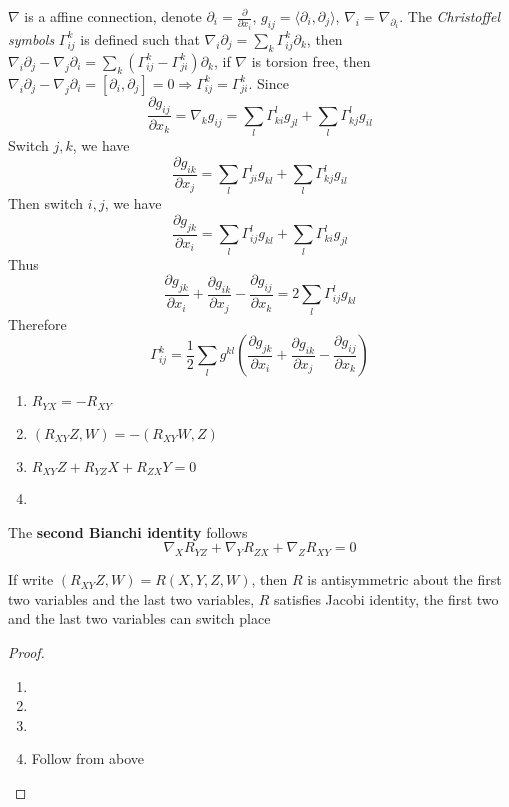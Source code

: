 \documentclass[main]{subfiles}
\begin{document}
\begin{definition}
$\nabla$ is a affine connection, denote $\partial_i=\frac{\partial}{\partial x_i}$, $g_{ij}=\langle\partial_i,\partial_j\rangle$, $\nabla_i=\nabla_{\partial_i}$. The \textit{Christoffel symbols} $\Gamma^k_{ij}$ is defined such that $\nabla_i\partial_j=\sum_{k}\Gamma^k_{ij}\partial_k$, then $\nabla_i\partial_j-\nabla_j\partial_i=\sum_k(\Gamma^k_{ij}-\Gamma^k_{ji})\partial_k$, if $\nabla$ is torsion free, then $\nabla_i\partial_j-\nabla_j\partial_i=[\partial_i,\partial_j]=0\Rightarrow\Gamma^k_{ij}=\Gamma^k_{ji}$. Since
\[\frac{\partial g_{ij}}{\partial x_k}=\nabla_kg_{ij}=\sum_{l}\Gamma^l_{ki}g_{jl}+\sum_{l}\Gamma^l_{kj}g_{il}\]
Switch $j,k$, we have
\[\frac{\partial g_{ik}}{\partial x_j}=\sum_{l}\Gamma^l_{ji}g_{kl}+\sum_{l}\Gamma^l_{kj}g_{il}\]
Then switch $i,j$, we have
\[\frac{\partial g_{jk}}{\partial x_i}=\sum_{l}\Gamma^l_{ij}g_{kl}+\sum_{l}\Gamma^l_{ki}g_{jl}\]
Thus
\[\frac{\partial g_{jk}}{\partial x_i}+\frac{\partial g_{ik}}{\partial x_j}-\frac{\partial g_{ij}}{\partial x_k}=2\sum_l\Gamma^l_{ij}g_{kl}\]
Therefore
\[\Gamma^k_{ij}=\frac{1}{2}\sum_lg^{kl}\left(\frac{\partial g_{jk}}{\partial x_i}+\frac{\partial g_{ik}}{\partial x_j}-\frac{\partial g_{ij}}{\partial x_k}\right)\]
\end{definition}

\begin{proposition} \hfill
\begin{enumerate}[leftmargin=*,label=\textbf{\arabic*.}]
\item $R_{YX}=-R_{XY}$
\item $(R_{XY}Z,W)=-(R_{XY}W,Z)$
\item $R_{XY}Z+R_{YZ}X+R_{ZX}Y=0$
\item 
\end{enumerate}
The \textbf{second Bianchi identity} follows
\[\nabla_XR_{YZ}+\nabla_YR_{ZX}+\nabla_ZR_{XY}=0\]
\end{proposition}

\begin{remark}
If write $(R_{XY}Z,W)=R(X,Y,Z,W)$, then $R$ is antisymmetric about the first two variables and the last two variables, $R$ satisfies Jacobi identity, the first two and the last two variables can switch place
\end{remark}

\begin{proof}
\begin{enumerate}[leftmargin=*,label=\textbf{\arabic*.}]
\item 
\item 
\item 
\item Follow from above
\end{enumerate}
\end{proof}
\end{document}
